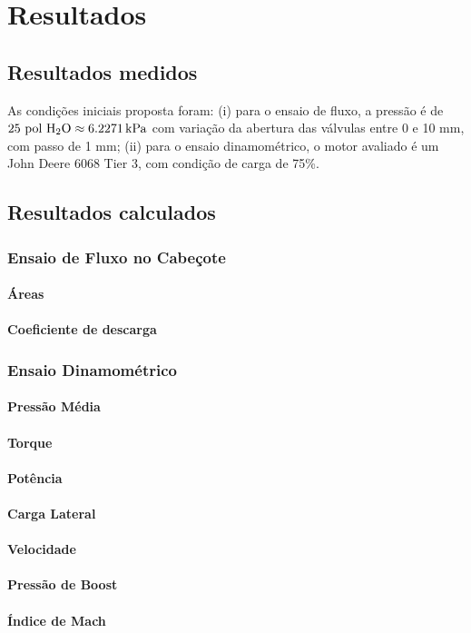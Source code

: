\chapter{Resultados}

\section{Resultados medidos}

As condições iniciais proposta foram: (i) para o ensaio de fluxo, a pressão é de $25 \text{ pol \ce{H2O}}  \approx  \SI{6,2271}{kPa}$ com variação da abertura das válvulas entre 0 e 10 mm, com passo de 1 mm; (ii) para o ensaio dinamométrico, o motor avaliado é um John Deere 6068 Tier 3, com condição de carga de 75\%.

\section{Resultados calculados}

\subsection{Ensaio de Fluxo no Cabeçote}

\subsubsection*{Áreas}

\subsubsection*{Coeficiente de descarga}


\subsection{Ensaio Dinamométrico}

\subsubsection*{Pressão Média}

\subsubsection*{Torque}

\subsubsection*{Potência}

\subsubsection*{Carga Lateral}

\subsubsection*{Velocidade}

\subsubsection*{Pressão de Boost}

\subsubsection*{Índice de Mach}